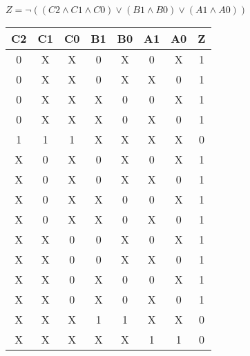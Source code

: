 \begin{center}
    {\(Z = \lnot ((C2 \land C1 \land C0) \lor (B1 \land B0) \lor (A1 \land A0)) \)}
    \begin{table}[h] %
        \begin{center}
            \begin{tabular}{|c|c|c|c|c|c|c||c|} \hline
            C2 & C1 & C0 & B1 & B0 & A1 & A0 & Z \\ \hline\hline
            0  & X  & X  & 0  & X  & 0  & X  & 1 \\ \hline
            0  & X  & X  & 0  & X  & X  & 0  & 1 \\ \hline
            0  & X  & X  & X  & 0  & 0  & X  & 1 \\ \hline
            0  & X  & X  & X  & 0  & X  & 0  & 1 \\ \hline
            1  & 1  & 1  & X  & X  & X  & X  & 0 \\ \hline
            X  & 0  & X  & 0  & X  & 0  & X  & 1 \\ \hline
            X  & 0  & X  & 0  & X  & X  & 0  & 1 \\ \hline
            X  & 0  & X  & X  & 0  & 0  & X  & 1 \\ \hline
            X  & 0  & X  & X  & 0  & X  & 0  & 1 \\ \hline
            X  & X  & 0  & 0  & X  & 0  & X  & 1 \\ \hline
            X  & X  & 0  & 0  & X  & X  & 0  & 1 \\ \hline
            X  & X  & 0  & X  & 0  & 0  & X  & 1 \\ \hline
            X  & X  & 0  & X  & 0  & X  & 0  & 1 \\ \hline
            X  & X  & X  & 1  & 1  & X  & X  & 0 \\ \hline
            X  & X  & X  & X  & X  & 1  & 1  & 0 \\ \hline
            \end{tabular}
        \end{center}
    \end{table}
\end{center}
